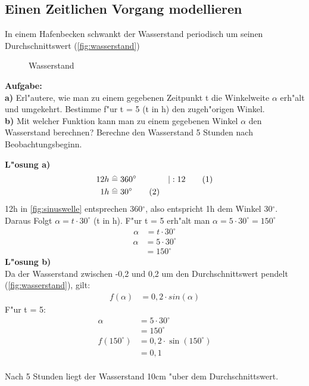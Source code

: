 \documentclass{standalone}
\begin{document}
\subsection{Einen Zeitlichen Vorgang modellieren}

\noindent In einem Hafenbecken schwankt der Wasserstand periodisch um seinen Durchschnittswert (\autoref{fig:wasserstand})

\begin{figure}[hb!]
  \center
  \def\svgwidth{500px}
  
  \caption{Wasserstand}
  \label{fig:wasserstand}
\end{figure}

\noindent \textbf{Aufgabe:}\\
\noindent \textbf{a)} Erl{"a}utere, wie man zu einem gegebenen Zeitpunkt t die Winkelweite $\alpha$ erh{"a}lt und umgekehrt. Bestimme f{"u}r t = 5 (t in h) den zugeh{"o}rigen Winkel.\\
\noindent \textbf{b)} Mit welcher Funktion kann man zu einem gegebenen Winkel $\alpha$ den Wasserstand berechnen? Berechne den Wasserstand 5 Stunden nach Beobachtungsbeginn.\\

\newpage

\noindent \textbf{L{"o}sung a)}
\begin{align}
  12h & \equalhat 360^\circ        & |:12\tag{1} \\
  1h  & \equalhat 30^\circ \tag{2}
\end{align}
\noindent 12h in {\autoref{fig:sinuswelle}} entsprechen 360$^\circ$, also entspricht 1h dem Winkel 30$^\circ$.
Daraus Folgt $\alpha = t \cdot 30^\circ$ (t in h). F{"u}r t = 5 erh{"a}lt man $\alpha = 5 \cdot 30^\circ = 150^\circ$
\begin{align}
  \alpha & = t \cdot 30^\circ \nonumber 
\end{align}
\begin{align}
  \alpha & = 5 \cdot 30^\circ \tag{1} \\ & = 150^\circ \tag{2}
\end{align}
\noindent \textbf{L{"o}sung b)}\\
Da der Wasserstand zwischen -0,2 und 0,2 um den Durchschnittswert pendelt (\autoref{fig:wasserstand}), gilt:
\begin{align}
  f(\alpha) & = 0,2 \cdot sin(\alpha)     \nonumber
\end{align}
\noindent F{"u}r t = 5:
\begin{align}
  \alpha       & = 5 \cdot 30^\circ     \tag{1}      \\
               & = 150^\circ   \tag{2}               \\
  f(150^\circ) & = 0,2 \cdot \sin(150^\circ) \tag{3} \\
               & = 0,1 \tag{4}
\end{align}\\
\noindent Nach 5 Stunden liegt der Wasserstand 10cm {"u}ber dem Durchschnittswert.
\end{document}
